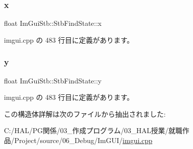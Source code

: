 \subsubsection{\texorpdfstring{x}{x}}
{\footnotesize\ttfamily float Im\+Gui\+Stb\+::\+Stb\+Find\+State\+::x}



 imgui.\+cpp の 483 行目に定義があります。

\mbox{\label{struct_im_gui_stb_1_1_stb_find_state_a16d674ba203b37cecd265f02bc679449}} 
\subsubsection{\texorpdfstring{y}{y}}
{\footnotesize\ttfamily float Im\+Gui\+Stb\+::\+Stb\+Find\+State\+::y}



 imgui.\+cpp の 483 行目に定義があります。



この構造体詳解は次のファイルから抽出されました\+:\begin{DoxyCompactItemize}
\item 
C\+:/\+H\+A\+L/\+P\+G関係/03\+\_\+作成プログラム/03\+\_\+\+H\+A\+L授業/就職作品/\+Project/source/06\+\_\+\+Debug/\+Im\+G\+U\+I/\mbox{\hyperlink{imgui_8cpp}{imgui.\+cpp}}\end{DoxyCompactItemize}
